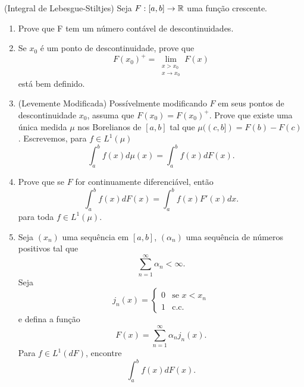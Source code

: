 \begin{problem}
    \label{prob:l7:4}
    (Integral de Lebesgue-Stiltjes) Seja $F:[a,b] \rightarrow \mathbb{R}$ uma função crescente.
    \begin{enumerate}[label=(\alph*)]
        \item Prove que F tem um número contável de descontinuidades.
        \item Se $x_0$ é um ponto de descontinuidade, prove que 
        $$F(x_0)^+ = \lim\limits_{\substack{x>x_0 \\ x\to x_0}} F(x)$$
        está bem definido.
        \item (Levemente Modificada) Possívelmente modificando $F$ em seus pontos de descontinuidade $x_0$, assuma que $F(x_0) = F(x_0)^+$. Prove que 
        existe uma única medida $\mu$ nos Borelianos de $[a,b]$ tal que $\mu((c,b]) = F(b) - F(c)$. Escrevemos, para $f \in L^1(\mu)$
        $$\int_{a}^{b} f(x) d\mu(x) = \int_{a}^{b} f(x)dF(x).$$
        \item Prove que se $F$ for continuamente diferenciável, então 
        $$\int_{a}^{b} f(x)dF(x) = \int_{a}^{b} f(x)F'(x)dx.$$
        para toda $f \in L^1(\mu)$.
        \item Seja $(x_n)$ uma sequência em $[a,b]$, $(\alpha_n)$ uma sequência de números positivos tal que 
        $$\sum_{n=1}^{\infty} \alpha_n < \infty.$$
        Seja
        $$j_n(x) = \begin{cases}
            0 & \text{se } x < x_n\\
            1 & \text{c.c.}
        \end{cases}$$
        e defina a função 
        $$F(x) = \sum_{n=1}^{\infty} \alpha_nj_n(x).$$
        Para $f \in L^1(dF)$, encontre 
        $$\int_{a}^{b} f(x)dF(x).$$
    \end{enumerate}
\end{problem}

